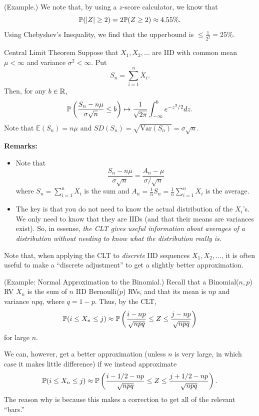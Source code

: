 \begin{mdframed}[nobreak=true]
    (Example.) We note that, by using a $z$-score calculator, we know that 
    \[\mathbb{P}(|Z| \geq 2) = 2\mathbb{P}(Z \geq 2) \approx 4.55\%.\]
    Using Chebyshev's Inequality, we find that the upperbound is $\leq \frac{1}{2^2} = 25\%$. 
\end{mdframed}

\begin{theorem}{Central Limit Theorem}{}
    Suppose that $X_1, X_2, \dots$ are IID with common mean $\mu < \infty$ and variance $\sigma^2 < \infty$. Put \[S_n = \sum_{i = 1}^{n} X_i.\] Then, for any $b \in \mathbb{R}$, 
    \[\mathbb{P}\left(\frac{S_n - n \mu}{\sigma\sqrt{n}} \leq b\right) \mapsto \frac{1}{\sqrt{2\pi}} \int_{-\infty}^{b} e^{-z^2 / 2}dz.\]
    Note that $\mathbb{E}(S_n) = n\mu$ and $SD(S_n) = \sqrt{\text{Var}(S_n)} = \sigma\sqrt{n}.$
\end{theorem}
\textbf{Remarks:} 
\begin{itemize}
    \item Note that 
    \[\frac{S_n - n\mu}{\sigma\sqrt{n}} = \frac{A_n - \mu}{\sigma / \sqrt{n}}\]
    where $S_n = \sum_{i = 1}^{n} X_i$ is the sum and $A_n = \frac{1}{n}S_n = \frac{1}{n} \sum_{i = 1}^{n} X_i$ is the average.  

    \item The key is that you do not need to know the actual distribution of the $X_i$'s. We only need to know that they are IIDs (and that their means are variances exist). So, in essense, \emph{the CLT gives useful information about averages of a distribution without needing to know what the distribution really is.}
\end{itemize}

Note that, when applying the CLT to \emph{discrete} IID sequences $X_1, X_2, \dots$, it is often useful to make a ``discrete adjustment'' to get a slightly better approximation. 

\begin{mdframed}[]
    (Example: Normal Approximation to the Binomial.) Recall that a Binomial($n, p$) RV $X_n$ is the sum of $n$ IID Bernoulli($p$) RVs, and that its mean is $np$ and variance $npq$, where $q = 1 - p$. Thus, by the CLT, 
    \[\mathbb{P}(i \leq X_n \leq j) \approx \mathbb{P}\left(\frac{i - np}{\sqrt{npq}} \leq Z \leq \frac{j - np}{\sqrt{npq}}\right)\]
    for large $n$.

    \bigskip 

    We can, however, get a better approximation (unless $n$ is very large, in which case it makes little difference) if we instead approximate
    \[\mathbb{P}(i \leq X_n \leq j) \approx \mathbb{P}\left(\frac{i - 1/2 - np}{\sqrt{npq}} \leq Z \leq \frac{j + 1/2 - np}{\sqrt{npq}}\right).\]
    The reason why is because this makes a correction to get all of the relevant ``bars.''
\end{mdframed}

